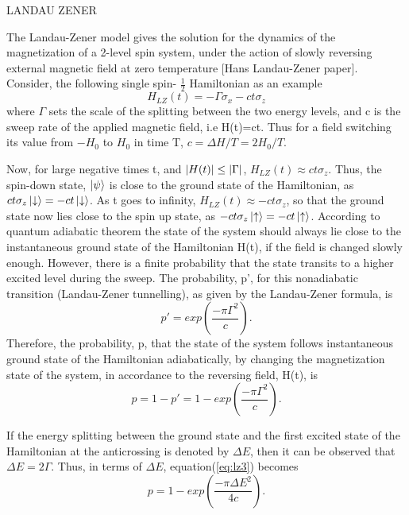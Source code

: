 \documentclass[12]{article}
\begin{document}
\begin{center}
\begin{Huge}
LANDAU ZENER
\end{Huge}
\end{center}
The Landau-Zener model gives the solution for the dynamics of the magnetization of a 2-level spin system, under the action of slowly reversing external magnetic field at zero temperature [Hans Landau-Zener paper]. Consider, the following single spin- $\frac{1}{2}$ Hamiltonian as an example
\begin{equation}
H_{LZ}(t)=-\Gamma \sigma_x -c t \sigma_z \label{eq:lz1}
\end{equation}
where $\Gamma$ sets the scale of the splitting between the two energy levels, and c is the sweep rate of the applied magnetic field, i.e H(t)=ct. Thus for a field switching its value from $-H_0$ to $H_0$ in time T, $c=\Delta H/T= 2H_0/T$.

Now, for large negative times t, and $\abs{H(t)} \leq \abs{\Gamma}$, $H_{LZ}(t)\approx ct \sigma_z$. Thus, the spin-down state, $\ket{\psi}$ is close to the ground state of the Hamiltonian, as $ct \sigma_z \ket{\downarrow}=-ct \ket{\downarrow}$. As t goes to infinity, $H_{LZ}(t)\approx -ct \sigma_z$, so that the ground state now lies close to the spin up state, as $-ct \sigma_z \ket{\uparrow}=-ct \ket{\uparrow}$. According to quantum adiabatic theorem the state of the system should always lie close to the instantaneous ground state of the Hamiltonian H(t), if the field is changed slowly enough. However, there is a finite probability that the state transits to a higher excited level during the sweep. The probability, p', for this nonadiabatic transition (Landau-Zener tunnelling), as given by the Landau-Zener formula, is
\begin{equation}
p'=exp(\frac{-\pi {\Gamma}^2}{c}) . 
\end{equation}
Therefore, the probability, p, that the state of the system follows instantaneous ground state of the Hamiltonian adiabatically, by changing the magnetization state of the system, in accordance to the reversing field, H(t), is
\begin{equation}
p=1-p'=1-exp(\frac{-\pi {\Gamma}^2}{c}) .   \label{eq:lz2}
\end{equation}

If the energy splitting between the ground state and the first excited state of the Hamiltonian at the anticrossing is denoted by $\Delta E$, then it can be observed that $\Delta E= 2 \Gamma$. Thus, in terms of $\Delta E$, equation(\ref{eq:lz3}) becomes 
\begin{equation}
p=1-exp(\frac{-\pi {\Delta E}^2}{4c}) .   \label{eq:lz3}
\end{equation}
\end{document}
